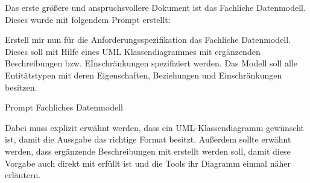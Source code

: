 Das erste größere und anspruchsvollere Dokument ist das Fachliche Datenmodell. Dieses wurde mit folgendem Prompt erstellt:

\begin{prompt}[H]
    \begin{tcolorbox}[colback=gray!20, colframe=gray!20, boxrule=0pt, sharp corners] 
        Erstell mir nun für die Anforderungsspezifikation das Fachliche Datenmodell. Dieses soll mit Hilfe eines UML Klassendiagrammes mit ergänzenden Beschreibungen 
        bzw. EInschränkungen spezifiziert werden. Das Modell soll alle Entitätstypen mit deren Eigenschaften, Beziehungen und Einschränkungen besitzen.
        \vfill
    \end{tcolorbox}
    \caption{Prompt Fachliches Datenmodell}
    \label{Prompt Fachliches Datenmodell}
\end{prompt}

Dabei muss explizit erwähnt werden, dass ein UML-Klassendiagramm gewünscht ist, damit die Aussgabe das richtige Format besitzt. Außerdem sollte erwähnt werden,
dass ergänzende Beschreibungen mit erstellt werden soll, damit diese Vorgabe auch direkt mit erfüllt ist und die Tools ihr Diagramm einmal näher erläutern.\\

